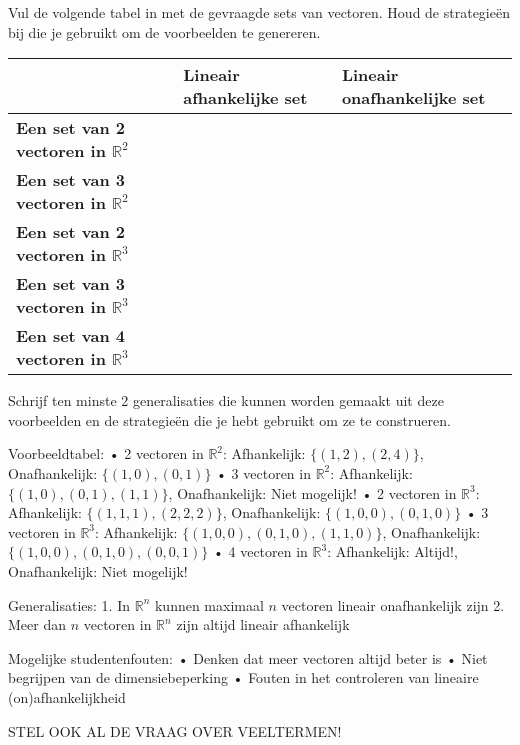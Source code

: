 \documentclass{ximera}
\begin{document}
\begin{problem}
Vul de volgende tabel in met de gevraagde sets van vectoren. Houd de strategieën bij die je gebruikt om de voorbeelden te genereren.

\begin{center}
\begin{tabular}{|p{4cm}|p{4cm}|p{4cm}|}
\hline
& \textbf{Lineair afhankelijke set} & \textbf{Lineair onafhankelijke set} \\
\hline
\textbf{Een set van 2 vectoren in $\mathbb{R}^2$} & & \\
\hline
\textbf{Een set van 3 vectoren in $\mathbb{R}^2$} & & \\
\hline
\textbf{Een set van 2 vectoren in $\mathbb{R}^3$} & & \\
\hline
\textbf{Een set van 3 vectoren in $\mathbb{R}^3$} & & \\
\hline
\textbf{Een set van 4 vectoren in $\mathbb{R}^3$} & & \\
\hline
\end{tabular}
\end{center}

Schrijf ten minste 2 generalisaties die kunnen worden gemaakt uit deze voorbeelden en de strategieën die je hebt gebruikt om ze te construeren.

\begin{freeResponse}
Voorbeeldtabel:
• 2 vectoren in $\mathbb{R}^2$: Afhankelijk: $\{(1,2), (2,4)\}$, Onafhankelijk: $\{(1,0), (0,1)\}$
• 3 vectoren in $\mathbb{R}^2$: Afhankelijk: $\{(1,0), (0,1), (1,1)\}$, Onafhankelijk: Niet mogelijk!
• 2 vectoren in $\mathbb{R}^3$: Afhankelijk: $\{(1,1,1), (2,2,2)\}$, Onafhankelijk: $\{(1,0,0), (0,1,0)\}$
• 3 vectoren in $\mathbb{R}^3$: Afhankelijk: $\{(1,0,0), (0,1,0), (1,1,0)\}$, Onafhankelijk: $\{(1,0,0), (0,1,0), (0,0,1)\}$
• 4 vectoren in $\mathbb{R}^3$: Afhankelijk: Altijd!, Onafhankelijk: Niet mogelijk!

Generalisaties:
1. In $\mathbb{R}^n$ kunnen maximaal $n$ vectoren lineair onafhankelijk zijn
2. Meer dan $n$ vectoren in $\mathbb{R}^n$ zijn altijd lineair afhankelijk
    
Mogelijke studentenfouten:
• Denken dat meer vectoren altijd beter is
• Niet begrijpen van de dimensiebeperking
• Fouten in het controleren van lineaire (on)afhankelijkheid
\end{freeResponse}
\end{problem}

STEL OOK AL DE VRAAG OVER VEELTERMEN!
\end{document}
